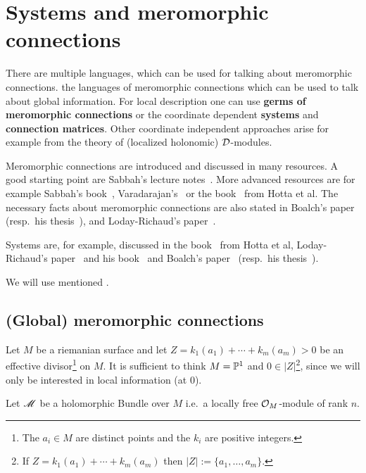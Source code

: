 \chapter{Systems and meromorphic connections}
There are multiple languages, which can be used for talking about meromorphic
connections.
 the languages of meromorphic connections which can be used to
talk about global information.
For local description one can use \textbf{germs of meromorphic connections} or
the coordinate dependent \textbf{systems} and \textbf{connection matrices}.
Other coordinate independent approaches arise for example from the theory of
(localized holonomic) $\cD$-modules.

Meromorphic connections are introduced and discussed in many resources.
A good starting point are Sabbah's lecture notes~\cite{sabbah_cimpa90}.
More advanced resources are for example
Sabbah's book~\cite{sabbah2007isomonodromic},
Varadarajan's~\cite{Varadarajan96linearmeromorphic} or
the book~\cite{hotta2008} from Hotta et al.
The necessary facts about meromorphic connections are also stated in
Boalch's paper~\cite{boalch} (resp.\ his thesis~\cite{thboalch}),
and Loday-Richaud's paper~\cite{Loday1994}.

Systems are, for example, discussed in
the book~\cite{hotta2008} from Hotta et al,
Loday-Richaud's paper~\cite{Loday1994} and his book~\cite{Loday2014} and
Boalch's paper~\cite{boalch} (resp.\ his thesis~\cite{thboalch}).

We will use  mentioned .

\section{(Global) meromorphic connections}
Let $M$ be a riemanian surface and let $Z=k_1(a_1)+\cdots+k_m(a_m)>0$ be an
effective divisor\footnote{The $a_i\in M$ are distinct points and the $k_i$ are
positive integers.} on $M$.
It is sufficient to think $M=\P^1$ and $0\in|Z|$\footnote{If
$Z=k_1(a_1)+\cdots+k_m(a_m)$ then $|Z|:=\{a_1,\dots,a_m\}$.}, since we will
only be interested in local information (at $0$).

Let $\sM$ be a holomorphic Bundle over $M$ i.e.\ a locally free $\cO_M$-module
of rank $n$.

